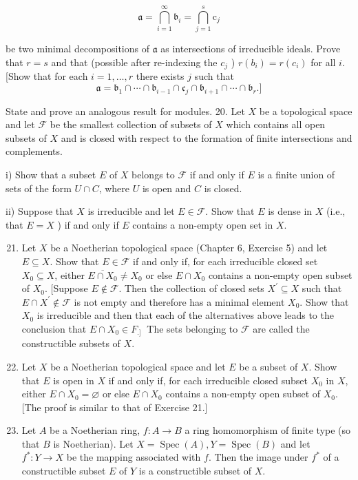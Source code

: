 \documentclass{standalone}
\theoremstyle{definition}
\theoremstyle{remark}
\begin{document}
\[
\mathfrak{a}=\bigcap_{i=1}^{\infty} \mathfrak{b}_{i}=\bigcap_{j=1}^{s} \mathrm{c}_{j}
\]

be two minimal decompositions of $\mathfrak{a}$ as intersections of irreducible ideals. Prove that $r=s$ and that (possible after re-indexing the $c_{j}$ ) $r\left(b_{i}\right)=r\left(c_{i}\right)$ for all $i$. [Show that for each $i=1, \ldots, r$ there exists $j$ such that
\[
  \mathfrak{a}=\mathfrak{b}_{1}\cap\cdots\cap \mathfrak{b}_{i-1}\cap \mathfrak{c}_{j}\cap \mathfrak{b}_{i+1}\cap\cdots\cap \mathfrak{b}_{r}.]
\]

State and prove an analogous result for modules. 20. Let $X$ be a topological space and let $\mathscr{F}$ be the smallest collection of subsets of $X$ which contains all open subsets of $X$ and is closed with respect to the formation of finite intersections and complements.

i) Show that a subset $E$ of $X$ belongs to $\mathscr{F}$ if and only if $E$ is a finite union of sets of the form $U \cap C$, where $U$ is open and $C$ is closed.

ii) Suppose that $X$ is irreducible and let $E \in \mathscr{F}$. Show that $E$ is dense in $X$ (i.e., that $E=X$ ) if and only if $E$ contains a non-empty open set in $X$.

\begin{enumerate}
  \setcounter{enumi}{20}
  \item Let $X$ be a Noetherian topological space (Chapter 6, Exercise 5) and let $E \subseteq X$. Show that $E \in \mathscr{F}$ if and only if, for each irreducible closed set $X_{0} \subseteq X$, either $\overline{E \cap X_{0}} \neq X_{0}$ or else $E \cap X_{0}$ contains a non-empty open subset of $X_{0}$. [Suppose $E \notin \mathscr{F}$. Then the collection of closed sets $X^{\prime} \subseteq X$ such that $E \cap X^{\prime} \notin \mathscr{F}$ is not empty and therefore has a minimal element $X_{0}$. Show that $X_{0}$ is irreducible and then that each of the alternatives above leads to the conclusion that $E \cap X_{0} \in F_{\text {.] }}$ The sets belonging to $\mathscr{F}$ are called the constructible subsets of $X$.

  \item Let $X$ be a Noetherian topological space and let $E$ be a subset of $X$. Show that $E$ is open in $X$ if and only if, for each irreducible closed subset $X_{0}$ in $X$, either $E \cap X_{0}=\varnothing$ or else $E \cap X_{0}$ contains a non-empty open subset of $X_{0}$. [The proof is similar to that of Exercise 21.]

  \item Let $A$ be a Noetherian ring, $f: A \rightarrow B$ a ring homomorphism of finite type (so that $B$ is Noetherian). Let $X=\operatorname{Spec}(A), Y=\operatorname{Spec}(B)$ and let $f^{*}: Y \rightarrow X$ be the mapping associated with $f$. Then the image under $f^{*}$ of a constructible subset $E$ of $Y$ is a constructible subset of $X$.

\end{enumerate}
\end{document}
